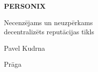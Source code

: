 \thispagestyle{empty}
\begin{center}
  {\sffamily\bfseries\fontsize{34}{40}\selectfont PERSONIX\par}
  \vspace{2.2em}
  {\rmfamily\large Necenzējams un neuzpērkams\\[0.25em]
   decentralizēts reputācijas tīkls\par}
\end{center}
\begin{center}
  {\rmfamily\Large Pavel Kudrna\par}
  \vspace{0.45em}
  {\rmfamily\small Prāga\quad\textbullet{}\par}
\end{center}
\clearpage

